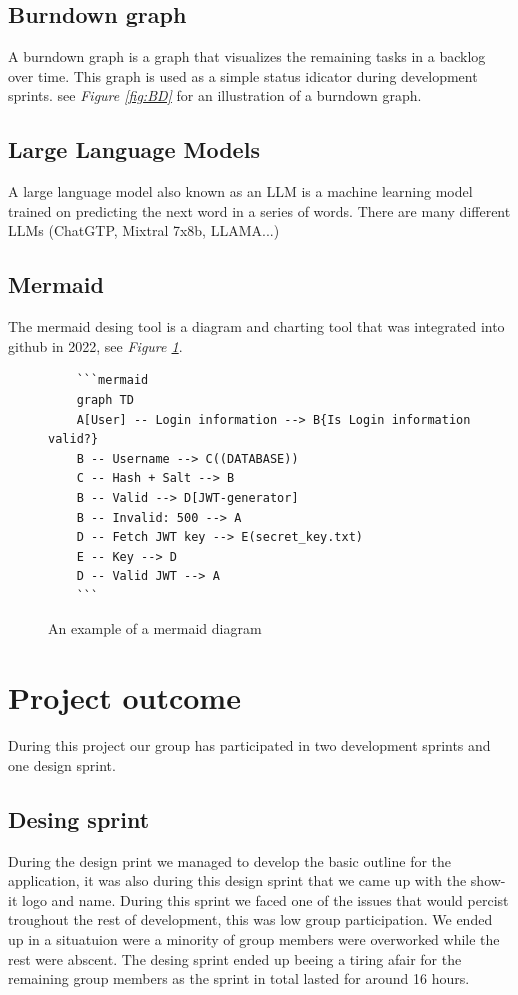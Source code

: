 \documentclass[12pt]{article}
\begin{document}
\subsection{Burndown graph\cite{BurndownChart2024}}
A burndown graph is a graph that visualizes the remaining tasks in a backlog over time.
This graph is used as a simple status idicator during development sprints.
see \textit{Figure \ref{fig:BD}} for an illustration of a burndown graph.
\subsection{Large Language Models\cite{aiMixtralExperts2023}}
A large language model also known as an LLM is a machine learning model trained on predicting the next word in a series of words.
There are many different LLMs (ChatGTP, Mixtral 7x8b, LLAMA...)
\subsection{Mermaid\cite{MermaidDiagrammingCharting}}
The mermaid desing tool is a diagram and charting tool that was integrated into github in 2022, see \textit{Figure \ref{fig:MM}}.
\begin{figure}[h]
    \begin{verbatim}
    ```mermaid
    graph TD
    A[User] -- Login information --> B{Is Login information valid?}
    B -- Username --> C((DATABASE))
    C -- Hash + Salt --> B
    B -- Valid --> D[JWT-generator]
    B -- Invalid: 500 --> A
    D -- Fetch JWT key --> E(secret_key.txt)
    E -- Key --> D
    D -- Valid JWT --> A
    ```
    \end{verbatim}
    \caption{An example of a mermaid diagram}
    \label{fig:MM}
\end{figure}

\section{Project outcome}
During this project our group has participated in two development sprints and one design sprint.
\subsection{Desing sprint}
During the design print we managed to develop the basic outline for the application, it was also during this
design sprint that we came up with the show-it logo and name. During this sprint we faced one of the issues that would 
percist troughout the rest of development, this was low group participation.
We ended up in a situatuion were a minority of group members were overworked while the rest were abscent.
The desing sprint ended up beeing a tiring afair for the remaining group members as the sprint in total lasted for around 16 hours.
\end{document}
